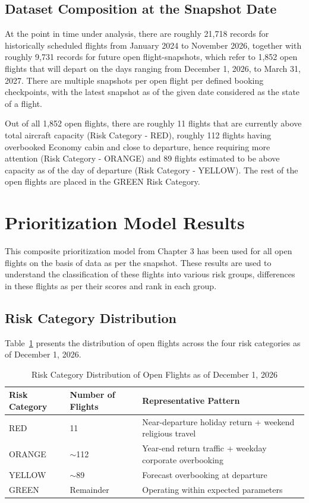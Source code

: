 \subsection{Dataset Composition at the Snapshot Date}

At the point in time under analysis, there are roughly 21,718 records for historically scheduled flights from January 2024 to November 2026, together with roughly 9,731 records for future open flight-snapshots, which refer to 1,852 open flights that will depart on the days ranging from December 1, 2026, to March 31, 2027. There are multiple snapshots per open flight per defined booking checkpoints, with the latest snapshot as of the given date considered as the state of a flight.

Out of all 1,852 open flights, there are roughly 11 flights that are currently above total aircraft capacity (Risk Category - RED), roughly 112 flights having overbooked Economy cabin and close to departure, hence requiring more attention (Risk Category - ORANGE) and 89 flights estimated to be above capacity as of the day of departure (Risk Category - YELLOW). The rest of the open flights are placed in the GREEN Risk Category.

\section{Prioritization Model Results}

This composite prioritization model from Chapter 3 has been used for all open flights on the basis of data as per the snapshot. These results are used to understand the classification of these flights into various risk groups, differences in these flights as per their scores and rank in each group.

\subsection{Risk Category Distribution}

Table~\ref{tab:risk-dist} presents the distribution of open flights across the four risk categories as of December 1, 2026.

\begin{table}[H]
\centering
\caption{Risk Category Distribution of Open Flights as of December 1, 2026}
\label{tab:risk-dist}
\begin{tabular}{llp{7cm}}
\hline
\textbf{Risk Category} & \textbf{Number of Flights} & \textbf{Representative Pattern} \\
\hline
RED & 11 & Near-departure holiday return + weekend religious travel \\
ORANGE & $\sim$112 & Year-end return traffic + weekday corporate overbooking \\
YELLOW & $\sim$89 & Forecast overbooking at departure \\
GREEN & Remainder & Operating within expected parameters \\
\hline
\end{tabular}
\end{table}

